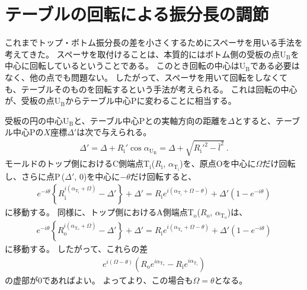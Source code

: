 \clearpage
\section{テーブルの回転による振分長の調節}
これまでトップ・ボトム振分長の差を小さくするためにスペーサを用いる手法を考えてきた。
スペーサを取付けることは、本質的にはボトム側の受板の点U$_\mathrm B$を中心に回転しているということである。
このとき回転の中心はU$_\mathrm B$である必要はなく、他の点でも問題ない。
したがって、スペーサを用いて回転をしなくても、テーブルそのものを回転するという手法が考えられる。
これは回転の中心が、受板の点U$_\mathrm B$からテーブル中心Pに変わることに相当する。

受板の円の中心U$_\mathrm B$と、テーブル中心Pとの実軸方向の距離を$\varDelta$とすると、テーブル中心Pの$X$座標$\varDelta'$は次で与えられる。
\begin{align}
  \label{eq:tableCenter}
  \varDelta'
  = \varDelta+R_\mathrm i'\cos\alpha_{\mathrm U_\mathrm B} = \varDelta+\sqrt{R_\mathrm i'^2-\bar l^2}\ .
\end{align}
モールドのトップ側におけるC側端点T$_\mathrm i$($R_\mathrm i$, $\alpha_{\mathrm T_\mathrm i}$)を、原点Oを中心に$\Omega$だけ回転し、さらに点P\,($\varDelta'$, $0$)を中心に$-\theta$だけ回転すると、
\begin{align}
  \label{eq:afterfttable}
  e^{-i\theta}\left\{R_\mathrm i^{i(\alpha_{\mathrm T_\mathrm i}+\Omega)}-\varDelta'\right\}+\varDelta'
  = R_\mathrm ie^{i(\alpha_{\mathrm T_\mathrm i}+\Omega-\theta)}+\varDelta'\left(1-e^{-i\theta}\right)
\end{align}
に移動する。
同様に、トップ側におけるA側端点T$_\mathrm o$($R_\mathrm o$, $\alpha_{\mathrm T_\mathrm o}$)は、
\begin{align*}
  e^{-i\theta}\!\left\{R_\mathrm o^{i(\alpha_{\mathrm T_\mathrm o}+\Omega)}-\varDelta'\right\}+\varDelta'
  = R_\mathrm ie^{i(\alpha_{\mathrm T_\mathrm o}+\Omega-\theta)}+\varDelta'\!\left(1-e^{-i\theta}\right)
\end{align*}
に移動する。
したがって、これらの差
\begin{align*}
  e^{i(\Omega-\theta)}\!
  \left(R_\mathrm oe^{i\alpha_{\mathrm T_\mathrm o}}-R_\mathrm ie^{i\alpha_{\mathrm T_\mathrm i}}\right)
\end{align*}
の虚部が$0$であればよい。
よってより、この場合も$\Omega = \theta$となる。



